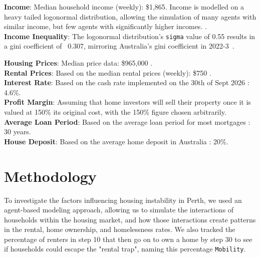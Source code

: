 \documentclass[11pt]{article}
\begin{document}
\noindent\textbf{Income}: Median household income (weekly): \$1,865.
Income is modelled on a heavy tailed logonormal distribution, allowing
the simulation of many agents with similar income, but few agents with significantly higher incomes.
\cite{abs2021greater}. \\
\noindent\textbf{Income Inequality}: The logonormal distribution's \texttt{sigma} value of 0.55 results in a gini coefficient of ~0.307,
mirroring Australia's gini coefficient in 2022-3~\cite{absgini}.

\noindent\textbf{Housing Prices}: Median price data: \$965,000 \cite{reiwa}. \\
\noindent\textbf{Rental Prices}: Based on the median rental prices  (weekly): \$750 \cite{reiwa}. \\
\noindent\textbf{Interest Rate}: Based on the cash rate implemented on the 30th of Sept 2026
\cite{ratehistory}: 4.6\%. \\
\noindent\textbf{Profit Margin}: Assuming that home investors will sell their property once it is 
valued at 150\% its original cost, with the 150\% figure chosen arbitrarily. \\
\noindent\textbf{Average Loan Period}: Based on the average loan period for most mortgages \cite{loanperiod}:
30 years. \\
\noindent\textbf{House Deposit}: Based on the average home deposit in Australia \cite{deposit}: 20\%. 


\section{Methodology}
To investigate the factors influencing housing instability in Perth, we used an agent-based modeling approach,
allowing us to simulate the interactions of households within the housing market, and how those interactions
create patterns in the rental, home ownership, and homelessness rates. We also tracked the percentage of
renters in step 10 that then go on to own a home by step 30 to see if households could escape the
"rental trap", naming this percentage \texttt{Mobility}. 
\end{document}
